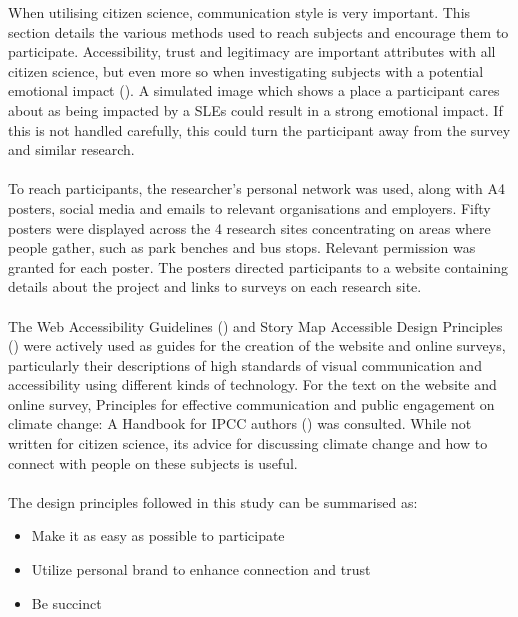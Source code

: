 When utilising citizen science, communication style is very important. This section details the various methods used to reach subjects and encourage them to participate. Accessibility, trust and legitimacy are important attributes with all citizen science, but even more so when investigating subjects with a potential emotional impact (\cite{tweddle_guide_2012}). A simulated image which shows a place a participant cares about as being impacted by a SLEs could result in a strong emotional impact. If this is not handled carefully, this could turn the participant away from the survey and similar research.
\paragraph{}

To reach participants, the researcher's personal network was used, along with A4 posters, social media and emails to relevant organisations and employers. Fifty posters were displayed across the 4 research sites concentrating on areas where people gather, such as park benches and bus stops. Relevant permission was granted for each poster. The posters directed participants to a website containing details about the project and links to surveys on each research site.
\paragraph{}

The Web Accessibility Guidelines (\cite{henry_web_2022}) and Story Map Accessible Design Principles (\cite{todd_liz_getting_nodate}) were actively used  as guides for the creation of the website and online surveys, particularly their descriptions of high standards of visual communication and accessibility using different kinds of technology. For the text on the website and online survey,  Principles for effective communication and public engagement on	climate change: A Handbook for IPCC authors (\cite{corner_a_principles_2018}) was consulted. While not written for citizen science, its advice for discussing climate change and how to connect with people on these subjects is useful. 
\paragraph{}

The design principles followed in this study can be summarised as:
\begin{itemize}
    \item Make it as easy as possible to participate
    \item Utilize personal brand to enhance connection and trust
    \item Be succinct
\end{itemize}
